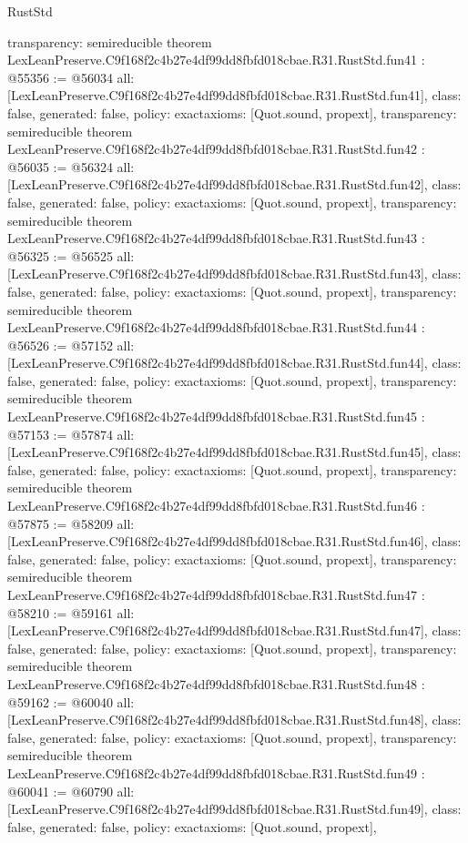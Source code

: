 \begin{lexlean}{RustStd}
\begin{coremodule}
{  transparency: semireducible
}
theorem LexLeanPreserve.C9f168f2c4b27e4df99dd8fbfd018cbae.R31.RustStd.fun41 : @55356 := @56034 {
  all: [LexLeanPreserve.C9f168f2c4b27e4df99dd8fbfd018cbae.R31.RustStd.fun41],
  class: false,
  generated: false,
  policy: exact{axioms: [Quot.sound, propext]},
  transparency: semireducible
}
theorem LexLeanPreserve.C9f168f2c4b27e4df99dd8fbfd018cbae.R31.RustStd.fun42 : @56035 := @56324 {
  all: [LexLeanPreserve.C9f168f2c4b27e4df99dd8fbfd018cbae.R31.RustStd.fun42],
  class: false,
  generated: false,
  policy: exact{axioms: [Quot.sound, propext]},
  transparency: semireducible
}
theorem LexLeanPreserve.C9f168f2c4b27e4df99dd8fbfd018cbae.R31.RustStd.fun43 : @56325 := @56525 {
  all: [LexLeanPreserve.C9f168f2c4b27e4df99dd8fbfd018cbae.R31.RustStd.fun43],
  class: false,
  generated: false,
  policy: exact{axioms: [Quot.sound, propext]},
  transparency: semireducible
}
theorem LexLeanPreserve.C9f168f2c4b27e4df99dd8fbfd018cbae.R31.RustStd.fun44 : @56526 := @57152 {
  all: [LexLeanPreserve.C9f168f2c4b27e4df99dd8fbfd018cbae.R31.RustStd.fun44],
  class: false,
  generated: false,
  policy: exact{axioms: [Quot.sound, propext]},
  transparency: semireducible
}
theorem LexLeanPreserve.C9f168f2c4b27e4df99dd8fbfd018cbae.R31.RustStd.fun45 : @57153 := @57874 {
  all: [LexLeanPreserve.C9f168f2c4b27e4df99dd8fbfd018cbae.R31.RustStd.fun45],
  class: false,
  generated: false,
  policy: exact{axioms: [Quot.sound, propext]},
  transparency: semireducible
}
theorem LexLeanPreserve.C9f168f2c4b27e4df99dd8fbfd018cbae.R31.RustStd.fun46 : @57875 := @58209 {
  all: [LexLeanPreserve.C9f168f2c4b27e4df99dd8fbfd018cbae.R31.RustStd.fun46],
  class: false,
  generated: false,
  policy: exact{axioms: [Quot.sound, propext]},
  transparency: semireducible
}
theorem LexLeanPreserve.C9f168f2c4b27e4df99dd8fbfd018cbae.R31.RustStd.fun47 : @58210 := @59161 {
  all: [LexLeanPreserve.C9f168f2c4b27e4df99dd8fbfd018cbae.R31.RustStd.fun47],
  class: false,
  generated: false,
  policy: exact{axioms: [Quot.sound, propext]},
  transparency: semireducible
}
theorem LexLeanPreserve.C9f168f2c4b27e4df99dd8fbfd018cbae.R31.RustStd.fun48 : @59162 := @60040 {
  all: [LexLeanPreserve.C9f168f2c4b27e4df99dd8fbfd018cbae.R31.RustStd.fun48],
  class: false,
  generated: false,
  policy: exact{axioms: [Quot.sound, propext]},
  transparency: semireducible
}
theorem LexLeanPreserve.C9f168f2c4b27e4df99dd8fbfd018cbae.R31.RustStd.fun49 : @60041 := @60790 {
  all: [LexLeanPreserve.C9f168f2c4b27e4df99dd8fbfd018cbae.R31.RustStd.fun49],
  class: false,
  generated: false,
  policy: exact{axioms: [Quot.sound, propext]},
}
\end{coremodule}
\end{lexlean}
